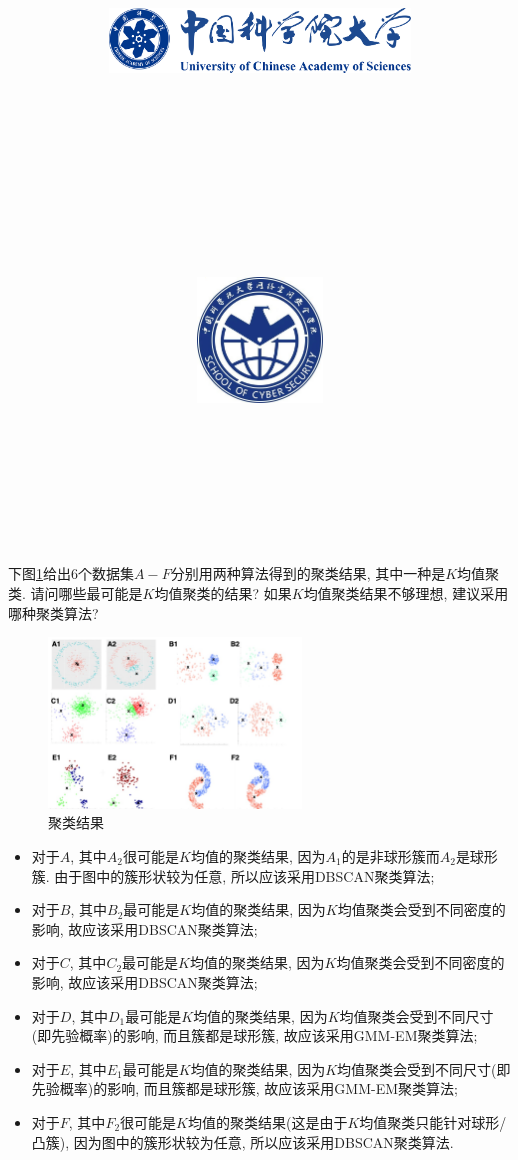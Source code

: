 \documentclass{article}
\title{
	\includegraphics[width=0.6\textwidth]{images/title/ucas_logo 1.pdf}\\
    \vspace{1in}
    \textmd{\textbf{\hmwkClass}}\\
	\textmd{\Large{\textbf{\hmwkClassID}}}\\
    \textmd{\textbf{\hmwkTitle}}\\
    \normalsize\vspace{0.1in}\large{\hmwkCompleteTime }\\
    \vspace{0.1in}\large{\textit{\hmwkClassInstructor\ }}\\
    \vspace{1in}
	\includegraphics[width=0.25\textwidth]{images/title/Cyber.jpg}\\
	\vspace{1in}
}
\author{
	\hmwkAuthorName \\ 
	\hmwkAuthorStuID \\
	\hmwkAuthorInst \\
	\hmwkAuthorzhuanye \\
	\hmwkAuthorfangxiang
	}
\date{}
\begin{document}
\maketitle


%
%
%
%
%



\begin{homeworkProblem}
	下图\ref{fig:聚类结果}给出6个数据集$A-F$分别用两种算法得到的聚类结果, 其中一种是$K$均值聚类. 请问哪些最可能是$K$均值聚类的结果? 如果$K$均值聚类结果不够理想, 建议采用哪种聚类算法?
	\begin{figure}[H]  %
		\centering
		\includegraphics[width=0.6\textwidth]{images/title/聚类结果.jpg}
		\caption{聚类结果}
		\label{fig:聚类结果}
	\end{figure}

	\solution
	\begin{itemize}
		\item 对于$A$, 其中$A_2$很可能是$K$均值的聚类结果, 因为$A_1$的是非球形簇而$A_2$是球形簇. 由于图中的簇形状较为任意, 所以应该采用DBSCAN聚类算法;
		\item 对于$B$, 其中$B_2$最可能是$K$均值的聚类结果, 因为$K$均值聚类会受到不同密度的影响, 故应该采用DBSCAN聚类算法;
		\item 对于$C$, 其中$C_2$最可能是$K$均值的聚类结果, 因为$K$均值聚类会受到不同密度的影响, 故应该采用DBSCAN聚类算法;
		\item 对于$D$, 其中$D_1$最可能是$K$均值的聚类结果, 因为$K$均值聚类会受到不同尺寸(即先验概率)的影响, 而且簇都是球形簇, 故应该采用GMM-EM聚类算法;
		\item 对于$E$, 其中$E_1$最可能是$K$均值的聚类结果, 因为$K$均值聚类会受到不同尺寸(即先验概率)的影响, 而且簇都是球形簇, 故应该采用GMM-EM聚类算法;
		\item 对于$F$, 其中$F_2$很可能是$K$均值的聚类结果(这是由于$K$均值聚类只能针对球形/凸簇), 因为图中的簇形状较为任意, 所以应该采用DBSCAN聚类算法.
	\end{itemize}
\end{homeworkProblem}
\end{document}

